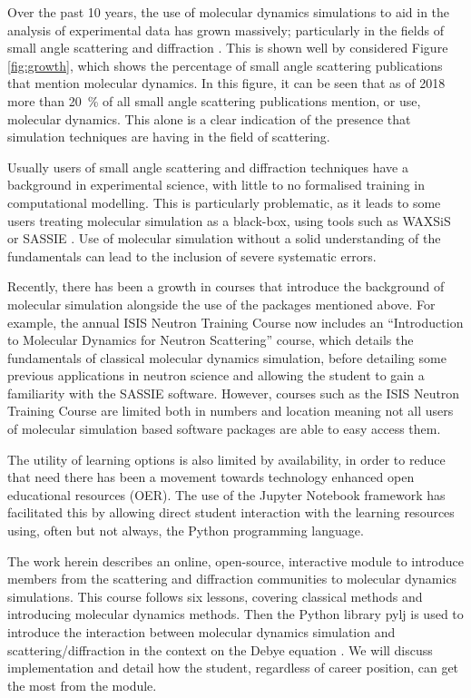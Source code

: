 \documentclass[pdf]{iucr}              %
\begin{document}
Over the past 10 years, the use of molecular dynamics simulations to aid in the analysis of experimental data has grown massively; particularly in the fields of small angle scattering and diffraction \cite{Pan2012,Boldon2015,Hub2018,Ivanovic2018,East2016,Wall2014,Wall2018,Satoh2015}.
This is shown well by considered Figure \ref{fig:growth}, which shows the percentage of small angle scattering publications that mention molecular dynamics.
In this figure, it can be seen that as of 2018 more than \SI{20}{\percent} of all small angle scattering publications mention, or use, molecular dynamics.
This alone is a clear indication of the presence that simulation techniques are having in the field of scattering.

Usually users of small angle scattering and diffraction techniques have a background in experimental science, with little to no formalised training in computational modelling.
This is particularly problematic, as it leads to some users treating molecular simulation as a black-box, using tools such as WAXSiS or SASSIE \cite{Chen2014,Knight2015,Perkins2016}.
Use of molecular simulation without a solid understanding of the fundamentals can lead to the inclusion of severe systematic errors.

Recently, there has been a growth in courses that introduce the background of molecular simulation alongside the use of the packages mentioned above.
For example, the annual ISIS Neutron Training Course now includes an ``Introduction to Molecular Dynamics for Neutron Scattering'' course, which details the fundamentals of classical molecular dynamics simulation, before detailing some previous applications in neutron science and allowing the student to gain a familiarity with the SASSIE software.
However, courses such as the ISIS Neutron Training Course are limited both in numbers and location meaning not all users of molecular simulation based software packages are able to easy access them.

The utility of learning options is also limited by availability, in order to reduce that need there has been a movement towards technology enhanced open educational resources (OER).
The use of the Jupyter Notebook framework \cite{Kluyver2016} has facilitated this by allowing direct student interaction with the learning resources using, often but not always, the Python programming language.

The work herein describes an online, open-source, interactive module to introduce members from the scattering and diffraction communities to molecular dynamics simulations.
This course follows six lessons, covering classical methods and introducing molecular dynamics methods.
Then the Python library pylj \cite{McCluskey2018} is used to introduce the interaction between molecular dynamics simulation and scattering/diffraction in the context on the Debye equation \cite{Debye1915}.
We will discuss implementation and detail how the student, regardless of career position, can get the most from the module.
\end{document}
